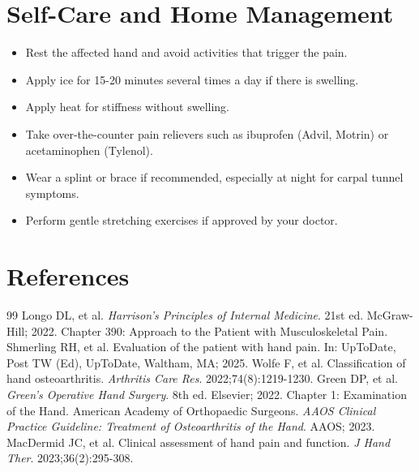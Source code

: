 \section*{Self-Care and Home Management}
\begin{itemize}
  \item Rest the affected hand and avoid activities that trigger the pain.
  \item Apply ice for 15-20 minutes several times a day if there is swelling.
  \item Apply heat for stiffness without swelling.
  \item Take over-the-counter pain relievers such as ibuprofen (Advil, Motrin) or acetaminophen (Tylenol).
  \item Wear a splint or brace if recommended, especially at night for carpal tunnel symptoms.
  \item Perform gentle stretching exercises if approved by your doctor.
\end{itemize}

\section*{References}

\begin{thebibliography}{99}
 Longo DL, et al. \emph{Harrison's Principles of Internal Medicine}. 21st ed. McGraw-Hill; 2022. Chapter 390: Approach to the Patient with Musculoskeletal Pain.
 Shmerling RH, et al. Evaluation of the patient with hand pain. In: UpToDate, Post TW (Ed), UpToDate, Waltham, MA; 2025.
 Wolfe F, et al. Classification of hand osteoarthritis. \emph{Arthritis Care Res}. 2022;74(8):1219-1230.
 Green DP, et al. \emph{Green's Operative Hand Surgery}. 8th ed. Elsevier; 2022. Chapter 1: Examination of the Hand.
 American Academy of Orthopaedic Surgeons. \emph{AAOS Clinical Practice Guideline: Treatment of Osteoarthritis of the Hand}. AAOS; 2023.
 MacDermid JC, et al. Clinical assessment of hand pain and function. \emph{J Hand Ther}. 2023;36(2):295-308.
\end{thebibliography}
